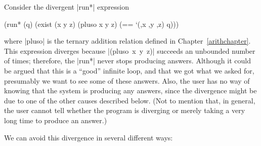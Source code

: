 Consider the divergent \scheme|run*| expression

\schemedisplayspace
\begin{schemedisplay}
(run* (q)
  (exist (x y z)
    (pluso x y z)
    (== `(,x ,y ,z) q)))
\end{schemedisplay}

\noindent where \scheme|pluso| is the ternary addition relation defined
in Chapter~\ref{arithchapter}.  This expression diverges because
\mbox{\scheme|(pluso x y z)|} succeeds an unbounded number of times;
therefore, the \scheme|run*| never stops producing answers.  Although
it could be argued that this is a ``good'' infinite loop, and that we
got what we asked for, presumably we want to see some of these
answers.  Also, the user has no way of knowing that the system is
producing any answers, since the divergence might be due to one of the
other causes described below.  (Not to mention that, in general, the
user cannot tell whether the program is diverging or merely taking a
very long time to produce an answer.)

We can avoid this divergence in several different ways:

